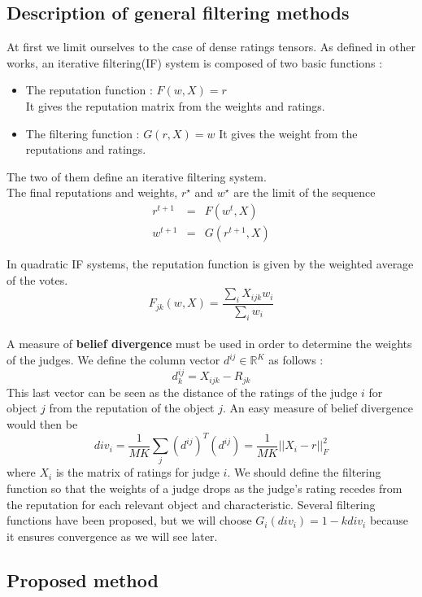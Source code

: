 \documentclass[12pt,a4paper]{article}
\begin{document}
\subsection{Description of general filtering methods}
At first we limit ourselves to the case of dense ratings tensors.
As defined in other works, an iterative filtering(IF) system is composed of two basic functions \cite{Cristo1} : 
\begin{itemize}
\item The reputation function : $F(w,X)=r$\\
It gives the reputation matrix from the weights and ratings.
\item The filtering function : $G(r,X)=w$
It gives the weight from the reputations and ratings.
\end{itemize}
The two of them define an iterative filtering system.\\
The final reputations and weights, $r^{\star}$ and $w^{\star}$ are the limit of the sequence 
\begin{eqnarray*}
r^{t+1} & = & F(w^t,X) \\
w^{t+1} & = & G(r^{t+1},X)
\end{eqnarray*}

In quadratic IF systems, the reputation function is given by the weighted average of the votes.
$$F_{jk}(w,X) = \frac{\sum_{i}X_{ijk}w_{i}}{\sum_i w_{i}}$$
\\
A measure of \textbf{belief divergence} must be used in order to determine the weights of the judges. 
We define the column vector $d^{ij} \in \mathbb{R}^K$ as follows :
$$ d^{ij}_k = X_{ijk}-R_{jk}$$
This last vector can be seen as the distance of the ratings of the judge $i$ for object $j$ from the reputation of the object $j$. An easy measure of belief divergence would then be 
$$div_i = \frac{1}{MK}\sum_{j} (d^{ij})^T (d^{ij}) = \frac{1}{MK}|| X_i - r ||_F^2$$
where $X_i$ is the matrix of ratings for judge $i$. We should define the filtering function so that the weights of a judge drops as the judge's rating recedes from the reputation for each relevant object and characteristic.
Several filtering functions have been proposed, but we will choose $G_i(div_i) = 1 - k div_i$ because it ensures convergence as we will see later.

\subsection{Proposed method}
\label{section:sub:iteration}
\end{document}

